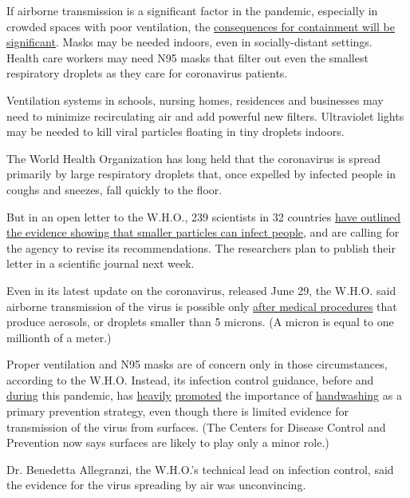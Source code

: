 If airborne transmission is a significant factor in the pandemic,
especially in crowded spaces with poor ventilation, the
\href{https://www.nytimes.com/2020/07/06/podcasts/the-daily/coronavirus-science-indoor-infection.html}{consequences
for containment will be significant}. Masks may be needed indoors, even
in socially-distant settings. Health care workers may need N95 masks
that filter out even the smallest respiratory droplets as they care for
coronavirus patients.

Ventilation systems in schools, nursing homes, residences and businesses
may need to minimize recirculating air and add powerful new filters.
Ultraviolet lights may be needed to kill viral particles floating in
tiny droplets indoors.

The World Health Organization has long held that the coronavirus is
spread primarily by large respiratory droplets that, once expelled by
infected people in coughs and sneezes, fall quickly to the floor.

But in an open letter to the W.H.O., 239 scientists in 32 countries
\href{https://academic.oup.com/cid/article/doi/10.1093/cid/ciaa939/5867798}{have
outlined the evidence showing that smaller particles can infect people},
and are calling for the agency to revise its recommendations. The
researchers plan to publish their letter in a scientific journal next
week.

Even in its latest update on the coronavirus, released June 29, the
W.H.O. said airborne transmission of the virus is possible only
\href{https://www.who.int/publications/i/item/WHO-2019-nCoV-IPC-2020.4}{after
medical procedures} that produce aerosols, or droplets smaller than 5
microns. (A micron is equal to one millionth of a meter.)

Proper ventilation and N95 masks are of concern only in those
circumstances, according to the W.H.O. Instead, its infection control
guidance, before and
\href{https://www.who.int/infection-prevention/en/}{during} this
pandemic, has
\href{https://www.who.int/infection-prevention/campaigns/ipc-global-survey-2019/en/}{heavily}
\href{https://www.who.int/infection-prevention/campaigns/clean-hands/5may2019/en/}{promoted}
the importance of \href{https://www.who.int/gpsc/ipc/en/}{handwashing}
as a primary prevention strategy, even though there is limited evidence
for transmission of the virus from surfaces. (The Centers for Disease
Control and Prevention now says surfaces are likely to play only a minor
role.)

Dr. Benedetta Allegranzi, the W.H.O.'s technical lead on infection
control, said the evidence for the virus spreading by air was
unconvincing.

